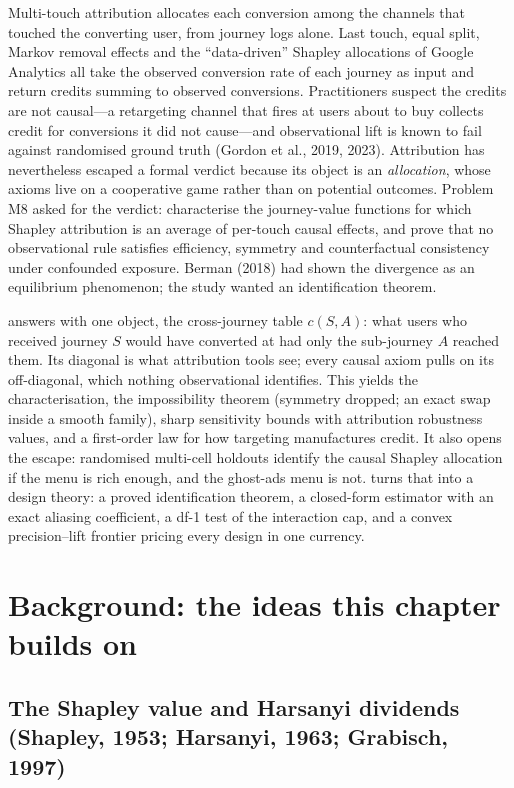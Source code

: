 Multi-touch attribution allocates each conversion among the channels that touched the converting user, from journey logs alone. Last touch, equal split, Markov removal effects and the ``data-driven'' Shapley allocations of Google Analytics all take the observed conversion rate of each journey as input and return credits summing to observed conversions. Practitioners suspect the credits are not causal---a retargeting channel that fires at users about to buy collects credit for conversions it did not cause---and observational lift is known to fail against randomised ground truth (Gordon et al., 2019, 2023). Attribution has nevertheless escaped a formal verdict because its object is an \emph{allocation}, whose axioms live on a cooperative game rather than on potential outcomes. Problem M8 asked for the verdict: characterise the journey-value functions for which Shapley attribution is an average of per-touch causal effects, and prove that no observational rule satisfies efficiency, symmetry and counterfactual consistency under confounded exposure. Berman (2018) had shown the divergence as an equilibrium phenomenon; the study wanted an identification theorem.

 answers with one object, the cross-journey table $c(S,A)$: what users who received journey $S$ would have converted at had only the sub-journey $A$ reached them. Its diagonal is what attribution tools see; every causal axiom pulls on its off-diagonal, which nothing observational identifies. This yields the characterisation, the impossibility theorem (symmetry dropped; an exact swap inside a smooth family), sharp sensitivity bounds with attribution robustness values, and a first-order law for how targeting manufactures credit. It also opens the escape: randomised multi-cell holdouts identify the causal Shapley allocation if the menu is rich enough, and the ghost-ads menu is not.  turns that into a design theory: a proved identification theorem, a closed-form estimator with an exact aliasing coefficient, a df-1 test of the interaction cap, and a convex precision--lift frontier pricing every design in one currency.

\section{Background: the ideas this chapter builds on}

\subsection{The Shapley value and Harsanyi dividends (Shapley, 1953; Harsanyi, 1963; Grabisch, 1997)}

